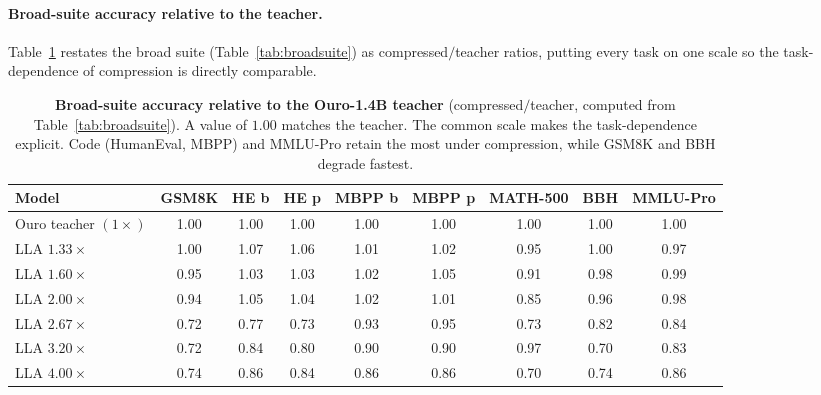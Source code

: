 {\paragraph{Broad-suite accuracy relative to the teacher.}
Table~\ref{tab:retention} restates the broad suite (Table~\ref{tab:broadsuite}) as compressed$/$teacher ratios, putting every task on one scale so the task-dependence of compression is directly comparable.
\begin{table}[H]
  \centering\footnotesize
  \caption{\textbf{Broad-suite accuracy relative to the Ouro-1.4B teacher} (compressed$/$teacher, computed from Table~\ref{tab:broadsuite}). A value of $1.00$ matches the teacher. The common scale makes the task-dependence explicit. Code (HumanEval, MBPP) and MMLU-Pro retain the most under compression, while GSM8K and BBH degrade fastest.}
  \label{tab:retention}
  \begin{tabular}{lcccccccc}
    \toprule
    Model & GSM8K & HE b & HE p & MBPP b & MBPP p & MATH-500 & BBH & MMLU-Pro \\
    \midrule
    Ouro teacher $(1\times)$ & 1.00 & 1.00 & 1.00 & 1.00 & 1.00 & 1.00 & 1.00 & 1.00 \\
    \midrule
    LLA $1.33\times$ & 1.00 & 1.07 & 1.06 & 1.01 & 1.02 & 0.95 & 1.00 & 0.97 \\
    LLA $1.60\times$ & 0.95 & 1.03 & 1.03 & 1.02 & 1.05 & 0.91 & 0.98 & 0.99 \\
    LLA $2.00\times$ & 0.94 & 1.05 & 1.04 & 1.02 & 1.01 & 0.85 & 0.96 & 0.98 \\
    LLA $2.67\times$ & 0.72 & 0.77 & 0.73 & 0.93 & 0.95 & 0.73 & 0.82 & 0.84 \\
    LLA $3.20\times$ & 0.72 & 0.84 & 0.80 & 0.90 & 0.90 & 0.97 & 0.70 & 0.83 \\
    LLA $4.00\times$ & 0.74 & 0.86 & 0.84 & 0.86 & 0.86 & 0.70 & 0.74 & 0.86 \\
    \bottomrule
  \end{tabular}
\end{table}%
}
